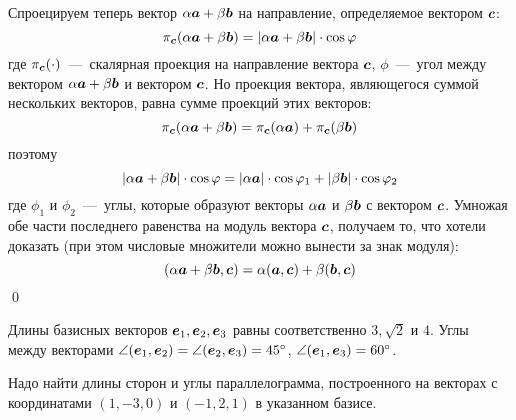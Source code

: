 \documentclass[a4paper,12pt]{article}
\begin{document}
  Спроецируем теперь вектор $\alpha \bds a \hm+ \beta \bds b$ на направление, определяемое вектором $\boldsymbol c$:
  \[
    \pi_{\boldsymbol c}(\alpha \boldsymbol a + \beta \boldsymbol b) = |\alpha \boldsymbol a + \beta \boldsymbol b| \cdot \cos \varphi
  \]
  где $\pi_{\boldsymbol c}(\cdot)$~---~скалярная проекция на направление вектора $\boldsymbol c$, %
  $\phi$~---~угол между вектором $\alpha \bds a \hm+ \beta \bds b$ и вектором $\boldsymbol c$.
  Но проекция вектора, являющегося суммой нескольких векторов, равна сумме проекций этих векторов: %
  \[
    \pi_{\boldsymbol c}(\alpha \boldsymbol a + \beta \boldsymbol b) = \pi_{\boldsymbol c}(\alpha \boldsymbol a) + \pi_{\boldsymbol c}(\beta \boldsymbol b)
  \]
  поэтому
  \[
    |\alpha \boldsymbol a + \beta \boldsymbol b| \cdot \cos \varphi = |\alpha \boldsymbol a| \cdot \cos \varphi_1 + |\beta \boldsymbol b| \cdot \cos \varphi_2
  \]
  где $\phi_1$ и $\phi_2$~---~углы, которые образуют векторы $\alpha \boldsymbol a$ и $\beta \boldsymbol b$ с вектором $\boldsymbol c$.
  Умножая обе части последнего равенства на модуль вектора $\boldsymbol c$, получаем то, что хотели доказать (при этом числовые множители можно вынести за знак модуля):
  \[
    (\alpha \boldsymbol a + \beta \boldsymbol b, \boldsymbol c) = \alpha (\boldsymbol a, \boldsymbol c) + \beta (\boldsymbol b, \boldsymbol c)
  \]
  \qed
  
  
  \begin{problem}[2.21]
    Длины базисных векторов $\boldsymbol e_1, \boldsymbol e_2, \boldsymbol e_3$ равны соответственно $3, \sqrt{2}$ и $4$.
    Углы между векторами $\angle (\bds e_1, \bds e_2) \hm= \angle (\bds e_2, \bds e_3) \hm= 45\degree$, $\angle (\bds e_1, \bds e_3) \hm= 60\degree$.
    
    Надо найти длины сторон и углы параллелограмма, построенного на векторах с координатами $(1, -3, 0)$ и $(-1, 2, 1)$ в указанном базисе.
  \end{problem}
  
\end{document}
